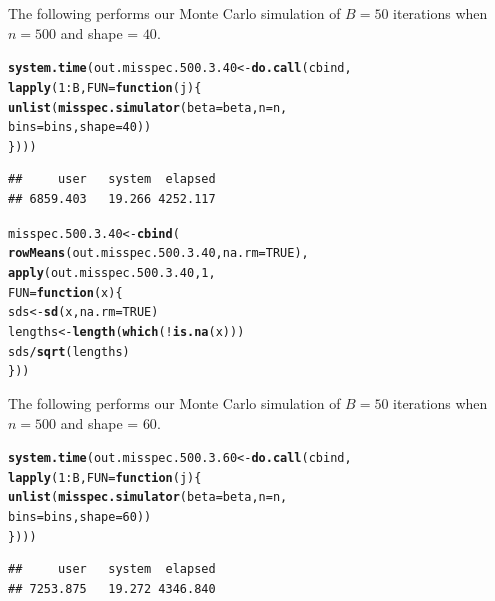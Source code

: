 \documentclass[11pt]{article}\usepackage[]{graphicx}\usepackage[]{color}
\makeatletter
\newcommand{\hlnum}[1]{\textcolor[rgb]{0.686,0.059,0.569}{#1}}%
\newcommand{\hlopt}[1]{\textcolor[rgb]{0,0,0}{#1}}%
\newcommand{\hlstd}[1]{\textcolor[rgb]{0.345,0.345,0.345}{#1}}%
\newcommand{\hlkwa}[1]{\textcolor[rgb]{0.161,0.373,0.58}{\textbf{#1}}}%
\newcommand{\hlkwb}[1]{\textcolor[rgb]{0.69,0.353,0.396}{#1}}%
\newcommand{\hlkwc}[1]{\textcolor[rgb]{0.333,0.667,0.333}{#1}}%
\newcommand{\hlkwd}[1]{\textcolor[rgb]{0.737,0.353,0.396}{\textbf{#1}}}%
\newenvironment{kframe}{%
 \def\at@end@of@kframe{}%
 \ifinner\ifhmode%
  \def\at@end@of@kframe{\end{minipage}}%
  \begin{minipage}{\columnwidth}%
 \fi\fi%
 \def\FrameCommand##1{\hskip\@totalleftmargin \hskip-\fboxsep
 \colorbox{shadecolor}{##1}\hskip-\fboxsep
     \hskip-\linewidth \hskip-\@totalleftmargin \hskip\columnwidth}%
 \MakeFramed {\advance\hsize-\width
   \@totalleftmargin\z@ \linewidth\hsize
   \@setminipage}}%
 {\par\unskip\endMakeFramed%
 \at@end@of@kframe}
\newenvironment{knitrout}{}{} %
\makeatother
\begin{document}
The following performs our Monte Carlo simulation of $B = 50$ iterations 
when $n = 500$ and shape = $40$.

\begin{knitrout}
\color{fgcolor}\begin{kframe}
\begin{alltt}
\hlkwd{system.time}\hlstd{(out.misspec.500.3.40} \hlkwb{<-} \hlkwd{do.call}\hlstd{(cbind,}
  \hlkwd{lapply}\hlstd{(}\hlnum{1}\hlopt{:}\hlstd{B,} \hlkwc{FUN} \hlstd{=} \hlkwa{function}\hlstd{(}\hlkwc{j}\hlstd{)\{}
    \hlkwd{unlist}\hlstd{(}\hlkwd{misspec.simulator}\hlstd{(}\hlkwc{beta} \hlstd{= beta,} \hlkwc{n} \hlstd{= n,}
      \hlkwc{bins} \hlstd{= bins,} \hlkwc{shape} \hlstd{=} \hlnum{40}\hlstd{))}
\hlstd{\})))}
\end{alltt}
\begin{verbatim}
##     user   system  elapsed 
## 6859.403   19.266 4252.117
\end{verbatim}
\end{kframe}
\end{knitrout}

\begin{knitrout}
\color{fgcolor}\begin{kframe}
\begin{alltt}
\hlstd{misspec.500.3.40} \hlkwb{<-} \hlkwd{cbind}\hlstd{(}
  \hlkwd{rowMeans}\hlstd{(out.misspec.500.3.40,} \hlkwc{na.rm} \hlstd{=} \hlnum{TRUE}\hlstd{),}
  \hlkwd{apply}\hlstd{(out.misspec.500.3.40,} \hlnum{1}\hlstd{,}
  \hlkwc{FUN} \hlstd{=} \hlkwa{function}\hlstd{(}\hlkwc{x}\hlstd{)\{}
    \hlstd{sds} \hlkwb{<-} \hlkwd{sd}\hlstd{(x,} \hlkwc{na.rm} \hlstd{=} \hlnum{TRUE}\hlstd{)}
    \hlstd{lengths} \hlkwb{<-} \hlkwd{length}\hlstd{(}\hlkwd{which}\hlstd{(}\hlopt{!}\hlkwd{is.na}\hlstd{(x)))}
    \hlstd{sds} \hlopt{/} \hlkwd{sqrt}\hlstd{(lengths)}
  \hlstd{\}))}
\end{alltt}
\end{kframe}
\end{knitrout}

The following performs our Monte Carlo simulation of $B = 50$ iterations 
when $n = 500$ and shape = $60$.

\begin{knitrout}
\color{fgcolor}\begin{kframe}
\begin{alltt}
\hlkwd{system.time}\hlstd{(out.misspec.500.3.60} \hlkwb{<-} \hlkwd{do.call}\hlstd{(cbind,}
  \hlkwd{lapply}\hlstd{(}\hlnum{1}\hlopt{:}\hlstd{B,} \hlkwc{FUN} \hlstd{=} \hlkwa{function}\hlstd{(}\hlkwc{j}\hlstd{)\{}
    \hlkwd{unlist}\hlstd{(}\hlkwd{misspec.simulator}\hlstd{(}\hlkwc{beta} \hlstd{= beta,} \hlkwc{n} \hlstd{= n,}
      \hlkwc{bins} \hlstd{= bins,} \hlkwc{shape} \hlstd{=} \hlnum{60}\hlstd{))}
\hlstd{\})))}
\end{alltt}
\begin{verbatim}
##     user   system  elapsed 
## 7253.875   19.272 4346.840
\end{verbatim}
\end{kframe}
\end{knitrout}
\end{document}
